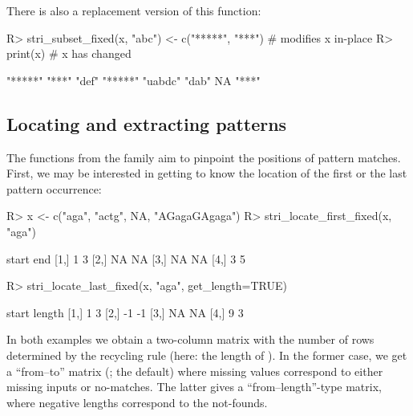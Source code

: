 \documentclass[nojss]{jss}
\begin{document}
There is also a replacement version of this function:

\begin{Schunk}
\begin{Sinput}
R> stri_subset_fixed(x, "abc") <- c("*****", "***")  # modifies x in-place
R> print(x)  # x has changed
\end{Sinput}
\begin{Soutput}
[1] "*****" "***"   "def"   "*****" "uabdc" "dab"   NA      "***"
\end{Soutput}
\end{Schunk}






\subsection{Locating and extracting patterns}

The functions from the  family
aim to pinpoint the positions of pattern matches.
First, we may be interested in getting to know the location of the
first or the last pattern occurrence:

\begin{Schunk}
\begin{Sinput}
R> x <- c("aga", "actg", NA, "AGagaGAgaga")
R> stri_locate_first_fixed(x, "aga")
\end{Sinput}
\begin{Soutput}
     start end
[1,]     1   3
[2,]    NA  NA
[3,]    NA  NA
[4,]     3   5
\end{Soutput}
\begin{Sinput}
R> stri_locate_last_fixed(x, "aga", get_length=TRUE)
\end{Sinput}
\begin{Soutput}
     start length
[1,]     1      3
[2,]    -1     -1
[3,]    NA     NA
[4,]     9      3
\end{Soutput}
\end{Schunk}

\noindent
In both examples we obtain a two-column matrix
with the number of rows determined by the recycling rule (here:
the length of ).
In the former case, we get a ``from--to'' matrix (;
the default) where missing values correspond to either missing inputs or
no-matches. The latter gives a ``from--length''-type matrix,
where negative lengths correspond to the not-founds.
\end{document}

